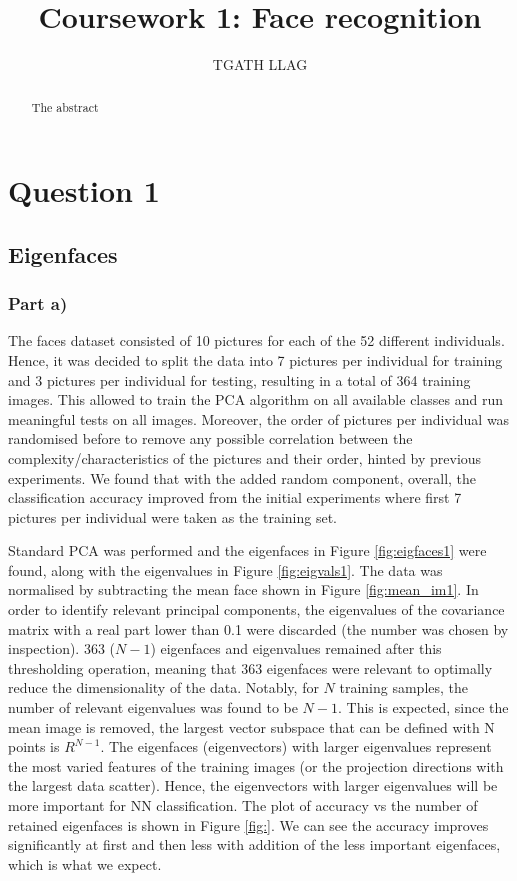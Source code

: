 \documentclass[10pt,technote]{IEEEtran}
\title{Coursework 1: Face recognition }
\author{TGATH LLAG}
\begin{document}
\maketitle
\begin{abstract}
The abstract
\end{abstract}

\section{Question 1}
\subsection{Eigenfaces}
\subsubsection{Part a)}
The faces dataset consisted of 10 pictures for each of the 52 different individuals. Hence, it was decided to split the data into 7 pictures per individual for training and 3 pictures per individual for testing, resulting in a total of 364 training images. This allowed to train the PCA algorithm on all available classes and run meaningful tests on all images. Moreover, the order of pictures per individual was randomised before to remove any possible correlation between the complexity/characteristics of the pictures and their order, hinted by previous experiments. We found that with the added random component, overall, the classification accuracy improved from the initial experiments where first 7  pictures per individual were taken as the training set.

Standard PCA was performed and the eigenfaces in Figure \ref{fig:eigfaces1} were found, along with the eigenvalues in Figure \ref{fig:eigvals1}. The data was normalised by subtracting the mean face shown in Figure \ref{fig:mean_im1}. In order to identify relevant principal components, the eigenvalues of the covariance matrix with a real part lower than 0.1 were discarded (the number was chosen by inspection). 363 ($N - 1$) eigenfaces and eigenvalues remained after this thresholding operation, meaning that 363 eigenfaces were relevant to optimally reduce the dimensionality of the data. Notably, for $N$ training samples, the number of relevant eigenvalues was found to be $N - 1$. This is expected, since the mean image is removed, the largest vector subspace that can be defined with N points is $R^{N-1}$.
The eigenfaces (eigenvectors) with larger eigenvalues represent the most varied features of the training images (or the projection directions with the largest data scatter). Hence, the eigenvectors with larger eigenvalues will be more important for NN classification.
The plot of accuracy vs the number of retained eigenfaces is shown in Figure \ref{fig:}. We can see the accuracy improves significantly at first and then less with addition of the less important eigenfaces, which is what we expect.
\end{document}
